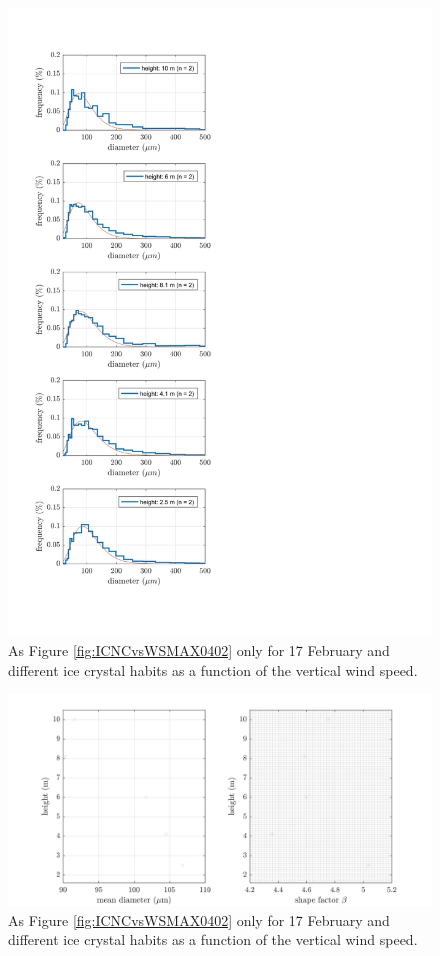 \documentclass[draft,linenumbers]{agujournal}
\begin{document}
\begin{figure}[t]
 \centering
 	\includegraphics[width=14cm]{gammaPDF.png}
 \caption{As Figure \ref{fig:ICNCvsWSMAX0402} only for 17 February and different ice crystal habits as a function of the vertical wind speed.}
 \label{fig:gammaPDF}
\end{figure}

\begin{figure}[t]
 \centering
 	\includegraphics[width=14cm]{MeanShape.png}
 \caption{As Figure \ref{fig:ICNCvsWSMAX0402} only for 17 February and different ice crystal habits as a function of the vertical wind speed.}
 \label{fig:shapeFactor}
\end{figure}
\end{document}
